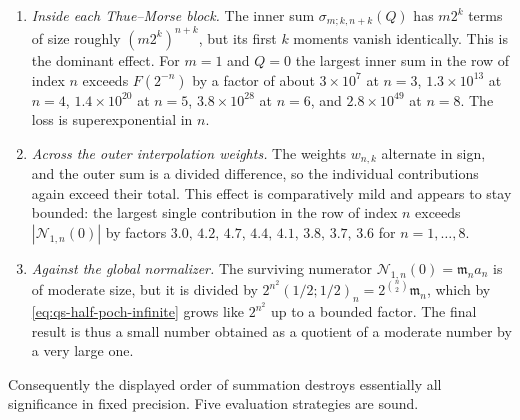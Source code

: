 \documentclass[11pt,oneside]{article}
\theoremstyle{definition}
\theoremstyle{remark}
\begin{document}
\begin{enumerate}
\item \emph{Inside each Thue--Morse block.}  The inner sum $\sigma_{m;k,n+k}(Q)$ has $m2^k$
terms of size roughly $(m2^k)^{n+k}$, but its first $k$ moments vanish identically.  This is
the dominant effect.  For $m=1$ and $Q=0$ the largest inner sum in the row of index $n$
exceeds $F(2^{-n})$ by a factor of about $3\times10^{7}$ at $n=3$, $1.3\times10^{13}$ at
$n=4$, $1.4\times10^{20}$ at $n=5$, $3.8\times10^{28}$ at $n=6$, and $2.8\times10^{49}$ at
$n=8$.  The loss is superexponential in $n$.
\item \emph{Across the outer interpolation weights.}  The weights $w_{n,k}$ alternate in sign,
and the outer sum is a divided difference, so the individual contributions again exceed their
total.  This effect is comparatively mild and appears to stay bounded: the largest single
contribution in the row of index $n$ exceeds $|\mathcal N_{1,n}(0)|$ by factors
$3.0,\,4.2,\,4.7,\,4.4,\,4.1,\,3.8,\,3.7,\,3.6$ for $n=1,\ldots,8$.
\item \emph{Against the global normalizer.}  The surviving numerator
$\mathcal N_{1,n}(0)=\mathfrak m_na_n$ is of moderate size, but it is divided by
$2^{n^2}(1/2;1/2)_n=2^{\binom n2}\mathfrak m_n$, which by
\eqref{eq:qs-half-poch-infinite} grows like $2^{n^2}$ up to a bounded factor.  The final
result is thus a small number obtained as a quotient of a moderate number by a very large one.
\end{enumerate}

Consequently the displayed order of summation destroys essentially all significance in fixed
precision.  Five evaluation strategies are sound.
\end{document}
